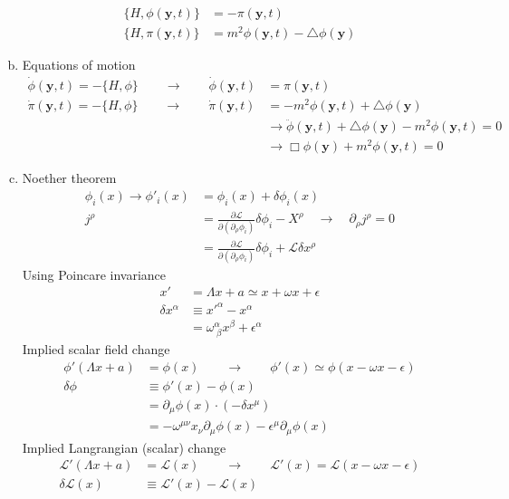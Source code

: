 \documentclass[10pt,a4paper]{report}
\theoremstyle{definition}
\begin{document}
\begin{enumerate}[a)]
\begin{align}
\{H,\phi(\mathbf{y},t)\}&=-\pi(\mathbf{y},t)\\
\{H,\pi(\mathbf{y},t)\}&=m^2\phi(\mathbf{y},t)-\triangle\phi(\mathbf{y})
\end{align}
\item Equations of motion
\begin{align}
\dot{\phi}(\mathbf{y},t)=-\{H,\phi\}\qquad\rightarrow\qquad\dot{\phi}(\mathbf{y},t)
&=\pi(\mathbf{y},t)\\
\dot{\pi}(\mathbf{y},t)=-\{H,\phi\}\qquad\rightarrow\qquad\dot{\pi}(\mathbf{y},t)
&=-m^2\phi(\mathbf{y},t)+\triangle\phi(\mathbf{y})\\
&\rightarrow \ddot{\phi}(\mathbf{y},t)+\triangle\phi(\mathbf{y})-m^2\phi(\mathbf{y},t)=0\\
&\rightarrow \Box\phi(\mathbf{y})+m^2\phi(\mathbf{y},t)=0
\end{align}
\item Noether theorem 
\begin{align}
\phi_i(x)\rightarrow\phi'_i(x)
&=\phi_i(x)+\delta\phi_i(x)\\
j^\rho
&=\frac{\partial\mathcal{L}}{\partial(\partial_\rho\phi_i)}\delta\phi_i-X^\rho
\quad\rightarrow\quad
\partial_\rho j^\rho=0\\
&=\frac{\partial\mathcal{L}}{\partial(\partial_\rho\phi_i)}\delta\phi_i+\mathcal{L}\delta x^\rho
\end{align}
Using Poincare invariance
\begin{align}
x'&=\Lambda x+a\simeq x+\omega x+\epsilon\\
\delta x^\alpha&\equiv x'^\alpha-x^\alpha\\
&=\omega^\alpha_{\;\beta}x^\beta+\epsilon^\alpha
\end{align}
Implied scalar field change
\begin{align}
\phi'(\Lambda x+a)&=\phi(x)\qquad\rightarrow\qquad\phi'(x)\simeq \phi(x-\omega x-\epsilon)\\
\delta\phi
&\equiv\phi'(x)-\phi(x)\\
&=\partial_\mu\phi(x)\cdot(-\delta x^\mu)\\
&=-\omega^{\mu\nu}x_\nu\partial_\mu\phi(x)-\epsilon^\mu\partial_\mu\phi(x)
\end{align}
Implied Langrangian (scalar) change
\begin{align}
\mathcal{L}'(\Lambda x+a)
&=\mathcal{L}(x)\qquad\rightarrow\qquad\mathcal{L}'(x)=\mathcal{L}(x-\omega x-\epsilon)\\
\delta\mathcal{L}(x)
&\equiv\mathcal{L}'(x)-\mathcal{L}(x)\\

\end{align}
\end{enumerate}
\end{document}
